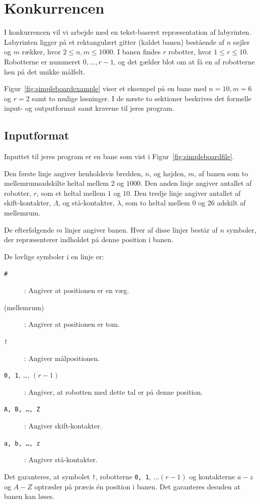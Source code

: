 \documentclass[10pt, a4paper]{article}
\begin{document}
\section{Konkurrencen}
I konkurrencen vil vi arbejde med en tekst-baseret repræsentation af labyrinten.
Labyrinten ligger på et rektangulært gitter (kaldet banen) bestående af $n$ søjler og $m$ rækker, hvor $2 \leq n,m \leq 1000$.
I banen findes $r$ robotter, hvor $1 \leq r \leq 10$. Robotterne er nummeret $0, \ldots, r-1$, og det gælder blot om at få en af robotterne hen på det unikke målfelt.

Figur~\ref{fig:simpleboardexample} viser et eksempel på en bane med $n=10, m=6$ og $r=2$ samt to mulige løsninger. I de næste to sektioner beskrives det formelle input- og outputformat samt kravene til jeres program.

\subsection{Inputformat}
Inputtet til jeres program er en bane som vist i Figur~\ref{fig:simpleboardfile}.

Den første linje angiver henholdsvis bredden,  $n$, og højden, $m$,  af banen som to mellemrumsadskilte heltal mellem $2$ og $1000$.
Den anden linje angiver antallet af robotter, $r$, som et heltal mellem $1$ og $10$.
Den tredje linje angiver antallet af skift-kontakter, $\Lambda$, og stå-kontakter, $\lambda$, som to heltal mellem $0$ og $26$ adskilt af mellemrum.

De efterfølgende $m$ linjer angiver banen.
Hver af disse linjer består af $n$ symboler, der repræsenterer indholdet på denne position i banen.

De lovlige symboler i en linje er:

\begin{description}
\item[\texttt{\#}]: Angiver at positionen er en væg.
\item[(mellemrum)]: Angiver at positionen er tom.
\item[\texttt{!}]: Angiver målpositionen.
\item[\texttt{0, 1}, \ldots, $(r-1)$]: Angiver, at robotten med dette tal er på denne position.
\item[\texttt{A, B, \ldots, Z}]: Angiver skift-kontakter.
\item[\texttt{a, b, \ldots, z}]: Angiver stå-kontakter.
\end{description}

Det garanteres, at symbolet \texttt{!}, robotterne \texttt{0, 1}, $\ldots (r-1)$ og kontakterne $a-z$ og $A-Z$ optræder på præcis én position i banen.
Det garanteres desuden at banen kan løses.
\end{document}
